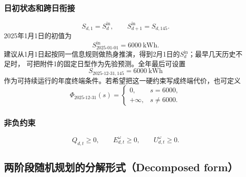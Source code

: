 \documentclass[UTF8,11pt]{ctexart}
\begin{document}
\subsubsection{日初状态和跨日衔接}

\begin{equation}
    S_{d,1}=S^{\mathrm{in}}_d,
    \qquad
    S^{\mathrm{in}}_{d+1}=S_{d,145}.
    \label{eq:q2-day-link}
\end{equation}
2025年1月1日的初值为
\begin{equation}
    S^{\mathrm{in}}_{\text{2025-01-01}}=6000\ \mathrm{kWh}.
\end{equation}
建议从1月1日起按同一信息规则做热身推演，得到2月1日的$S^{\mathrm{in}}_d$；最早几天历史不足时，
可把附件1的固定日型作为先验预测。全年最后可设置
\begin{equation}
    S_{\text{2025-12-31},145}=6000\ \mathrm{kWh}
\end{equation}
作为可持续运行的年度终端条件。若希望把这一硬约束写成终端代价，也可定义
\begin{equation}
\Phi_{\text{2025-12-31}}(s)=
\begin{cases}
0, & s=6000,\\
+\infty, & s\neq6000.
\end{cases}
\end{equation}

\subsubsection{非负约束}

\begin{equation}
    Q_{d,t}\geq0,
    \qquad E^{\omega}_{d,t}\geq0,
    \qquad U^{\omega}_{d,t}\geq0.
    \label{eq:q2-nonnegative}
\end{equation}

\subsection{两阶段随机规划的分解形式（Decomposed form）}
\end{document}
